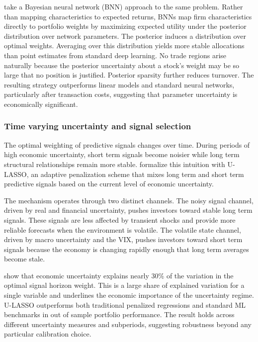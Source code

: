 \cite{bianchi2026uncertainty} take a Bayesian neural network (BNN) approach to the same problem. Rather than mapping characteristics to expected returns, BNNs map firm characteristics directly to portfolio weights by maximizing expected utility under the posterior distribution over network parameters. The posterior induces a distribution over optimal weights. Averaging over this distribution yields more stable allocations than point estimates from standard deep learning. No trade regions arise naturally because the posterior uncertainty about a stock's weight may be so large that no position is justified. Posterior sparsity further reduces turnover. The resulting strategy outperforms linear models and standard neural networks, particularly after transaction costs, suggesting that parameter uncertainty is economically significant.

\subsubsection{Time varying uncertainty and signal selection}\label{sec_timevarying_unc}

The optimal weighting of predictive signals changes over time. During periods of high economic uncertainty, short term signals become noisier while long term structural relationships remain more stable. \cite{chen2026uncertainty} formalize this intuition with U-LASSO, an adaptive penalization scheme that mixes long term and short term predictive signals based on the current level of economic uncertainty.

The mechanism operates through two distinct channels. The noisy signal channel, driven by real and financial uncertainty, pushes investors toward stable long term signals. These signals are less affected by transient shocks and provide more reliable forecasts when the environment is volatile. The volatile state channel, driven by macro uncertainty and the VIX, pushes investors toward short term signals because the economy is changing rapidly enough that long term averages become stale.

\cite{chen2026uncertainty} show that economic uncertainty explains nearly 30\% of the variation in the optimal signal horizon weight. This is a large share of explained variation for a single variable and underlines the economic importance of the uncertainty regime. U-LASSO outperforms both traditional penalized regressions and standard ML benchmarks in out of sample portfolio performance. The result holds across different uncertainty measures and subperiods, suggesting robustness beyond any particular calibration choice.

